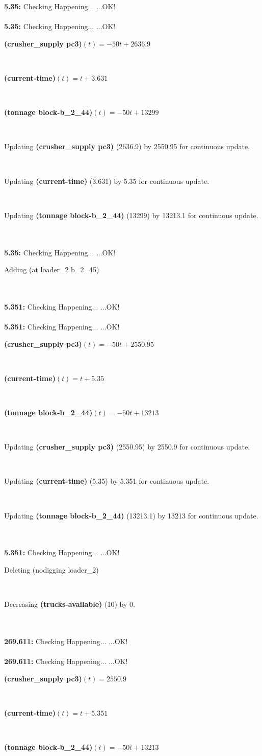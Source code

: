 \documentclass[a4paper,12pt]{article}
\newcommand{\atime}[1]{{\bf #1:}}
\newcommand{\exprn}[1]{{\sf #1}}
\newcommand{\fexprn}[1]{{\small {\bf #1}}}
\newcommand{\checkhappening}{Checking Happening... }
\newcommand{\listrow}[1]{\begin{minipage}[t]{11.5cm} #1 \end{minipage}}
\newcommand{\happeningOK}{...OK!}
\newcommand{\assignmentcts}[3]{\listrow{Updating \fexprn{#1} (#2) by #3 for continuous update.}}
\newcommand{\decrease}[3]{\listrow{Decreasing \fexprn{#1} (#2) by #3.}}
\newcommand{\function}[2]{\listrow{\fexprn{#1}$(t) = #2$}}
\newcommand{\adding}[1]{\listrow{Adding \exprn{#1} }}
\newcommand{\deleting}[1]{\listrow{Deleting \exprn{#1} }}
\begin{document}
\begin{tabbing}
\atime{5.35} \> \checkhappening\happeningOK\\
\\
\atime{5.35} \> \checkhappening\happeningOK\\
 \> \function{(crusher\_supply pc3)}{ - 50t + 2636.9}\\
 \> \function{(current-time)}{t + 3.631}\\
 \> \function{(tonnage block-b\_2\_44)}{ - 50t + 13299}\\
 \> \assignmentcts{(crusher\_supply pc3)}{2636.9}{2550.95}\\
 \> \assignmentcts{(current-time)}{3.631}{5.35}\\
 \> \assignmentcts{(tonnage block-b\_2\_44)}{13299}{13213.1}\\
\\
\atime{5.35} \> \checkhappening\happeningOK\\
 \> \adding{(at loader\_2 b\_2\_45)}\\
\\
\atime{5.351} \> \checkhappening\happeningOK\\
\\
\atime{5.351} \> \checkhappening\happeningOK\\
 \> \function{(crusher\_supply pc3)}{ - 50t + 2550.95}\\
 \> \function{(current-time)}{t + 5.35}\\
 \> \function{(tonnage block-b\_2\_44)}{ - 50t + 13213}\\
 \> \assignmentcts{(crusher\_supply pc3)}{2550.95}{2550.9}\\
 \> \assignmentcts{(current-time)}{5.35}{5.351}\\
 \> \assignmentcts{(tonnage block-b\_2\_44)}{13213.1}{13213}\\
\\
\atime{5.351} \> \checkhappening\happeningOK\\
 \> \deleting{(nodigging loader\_2)}\\
 \> \decrease{(trucks-available)}{10}{0}\\
\\
\atime{269.611} \> \checkhappening\happeningOK\\
\\
\atime{269.611} \> \checkhappening\happeningOK\\
 \> \function{(crusher\_supply pc3)}{2550.9}\\
 \> \function{(current-time)}{t + 5.351}\\
 \> \function{(tonnage block-b\_2\_44)}{ - 50t + 13213}\\

\end{tabbing}
\end{document}
